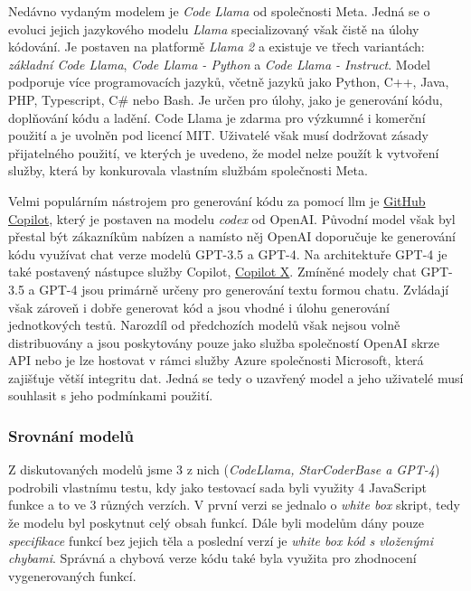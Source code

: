 \documentclass[czech, ma, kiv, he, iso690alph, pdf, viewonly]{fasthesis}
\begin{document}
    Nedávno vydaným modelem je \textit{Code Llama} od společnosti Meta. Jedná se o evoluci jejich jazykového modelu \textit{Llama} specializovaný však čistě na úlohy kódování. Je postaven na platformě \textit{Llama 2} a existuje ve třech variantách: \textit{základní Code Llama}, \textit{Code Llama - Python} a \textit{Code Llama - Instruct}. Model podporuje více programovacích jazyků, včetně jazyků jako Python, C++, Java, PHP, Typescript, C# nebo Bash. Je určen pro úlohy, jako je generování kódu, doplňování kódu a ladění. Code Llama je zdarma pro výzkumné i komerční použití a je uvolněn pod licencí MIT. Uživatelé však musí dodržovat  zásady přijatelného použití, ve kterých je uvedeno, že model nelze použít k vytvoření služby, která by konkurovala vlastním službám společnosti Meta. 

    Velmi populárním nástrojem pro generování kódu za pomocí \gls{llm} je \href{https://github.com/features/copilot}{GitHub Copilot}, který je postaven na modelu \textit{codex} od OpenAI. Původní model však byl přestal být zákazníkům nabízen a namísto něj OpenAI doporučuje ke generování kódu využívat chat verze modelů GPT-3.5 a GPT-4. Na architektuře GPT-4 je také postavený nástupce služby Copilot, \href{https://github.com/features/preview/copilot-x}{Copilot X}. Zmíněné modely chat GPT-3.5 a GPT-4 jsou primárně určeny pro generování textu formou chatu. Zvládají však zároveň i dobře generovat kód a jsou vhodné i úlohu generování jednotkových testů. Narozdíl od předchozích modelů však nejsou volně distribuovány a jsou poskytovány pouze jako služba společností OpenAI skrze API nebo je lze hostovat v rámci služby Azure společnosti Microsoft, která zajišťuje větší integritu dat. Jedná se tedy o uzavřený model a jeho uživatelé musí souhlasit s jeho podmínkami použití.


        \subsubsection{Srovnání modelů}
        Z diskutovaných modelů jsme 3 z nich (\textit{CodeLlama, StarCoderBase a GPT-4}) podrobili vlastnímu testu, kdy jako testovací sada byli využity 4 JavaScript funkce a to ve 3 různých verzích. V první verzi se jednalo o \emph{white box} skript, tedy že modelu byl poskytnut celý obsah funkcí. Dále byli modelům dány pouze \emph{specifikace} funkcí bez jejich těla a poslední verzí je \emph{white box kód s vloženými chybami}. Správná a chybová verze kódu také byla využita pro zhodnocení vygenerovaných funkcí.
\end{document}
